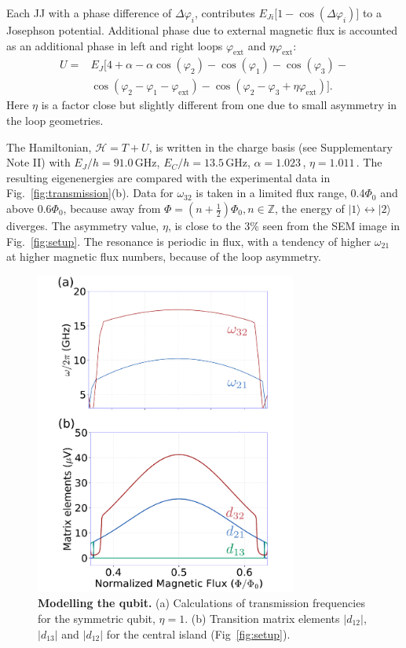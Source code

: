 \documentclass[%
reprint,
superscriptaddress,
bibnotes,
amsmath,
amssymb,
aps,
showkeys,
prb,
]{revtex4-1}
\newcommand{\iunit}[2]{\ensuremath{#1\,\text{#2}}}
\begin{document}
{Each  JJ  with  a  phase  difference  of  $\Delta\varphi_{i}$,  contributes $ E_{Ji}\big[1 - \cos(\Delta\varphi_i)\big] $ to a Josephson potential.   Additional phase due to external magnetic flux is accounted as an additional phase in left and right loops
$ \varphi_\text{ext} $ and $ \eta\varphi_\text{ext} $:
\begin{equation}\label{eq:kinetic}
  \begin{aligned}
    U  = &E_J\big[4 + \alpha - \alpha\cos(\varphi_{2}) -\cos(\varphi_{1}) -\cos(\varphi_{3}) - \\
    & \cos(\varphi_{2}   -  \varphi_{1}  -  \varphi_{\text{ext}})  -  \cos(\varphi_{2}   -  \varphi_{3}  +
    \eta\varphi_{\text{ext}})\big].
  \end{aligned}
\end{equation}
Here $\eta$ is a factor close but slightly different from one due to small asymmetry in the loop geometries.

The  Hamiltonian, $\mathcal{H}= T + U$, is  written  in  the charge  basis (see Supplementary Note II)  with
\iunit{E_J/h = 91.0}{GHz}, \iunit{E_C/h = 13.5}{GHz}, \iunit{\alpha = 1.023}{}, \iunit{\eta
  = 1.011}{}. The resulting eigenenergies are compared with the experimental data in
Fig.~\ref{fig:transmission}(b).  Data for $ \omega_{32} $ is taken in a limited flux range, 0.4$\Phi_0$ and above 0.6$\Phi_0$,
because away from $ \Phi = (n + \frac{1}{2}) \Phi_0, n\in\mathbb{Z} $, the energy of $|1\rangle \leftrightarrow |2\rangle$ diverges.  The  asymmetry value, $ \eta $,  is close to
the  3\%  seen  from  the   SEM  image  in
Fig.~\ref{fig:setup}.  The  resonance is  periodic in flux,  with a  tendency of
higher $\omega_{21}$ at higher magnetic flux numbers, because of the loop asymmetry.

\begin{figure}
  \includegraphics[width=86mm]{fig3}
  \caption{\small \textbf{Modelling the qubit.}
    (a) Calculations of transmission frequencies for the symmetric qubit,
    $\eta=1$. (b) Transition matrix elements $|d_{12}|$, $|d_{13}|$ and $|d_{12}|$ for the central island (Fig~\ref{fig:setup}).
  \label{fig:simulations}}
\end{figure}

}
\end{document}
